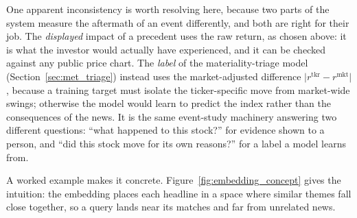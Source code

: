 One apparent inconsistency is worth resolving here, because two parts of the system measure the
aftermath of an event differently, and both are right for their job. The \emph{displayed} impact of a
precedent uses the raw return, as chosen above: it is what the investor would actually have experienced,
and it can be checked against any public price chart. The \emph{label} of the materiality-triage model
(Section~\ref{sec:met_triage}) instead uses the market-adjusted difference
$\lvert r^{\mathrm{tkr}} - r^{\mathrm{mkt}} \rvert$, because a training target must isolate the
ticker-specific move from market-wide swings; otherwise the model would learn to predict the index
rather than the consequences of the news. It is the same event-study machinery answering two different
questions: ``what happened to this stock?'' for evidence shown to a person, and ``did this stock move
for its own reasons?'' for a label a model learns from.

A worked example makes it concrete. Figure~\ref{fig:embedding_concept} gives the intuition: the embedding
places each headline in a space where similar themes fall close together, so a query lands near its
matches and far from unrelated news.


